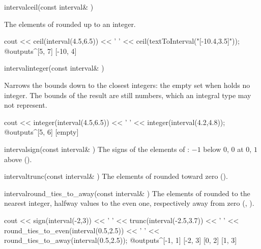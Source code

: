 \begin{deffun}{interval}{ceil}{(const interval\& )}
  \begin{operation}
  \end{operation}
  The elements of  rounded up to an integer.
  \begin{example}
cout << ceil(interval(4.5,6.5)) << ' '
     << ceil(textToInterval("[-10.4,3.5]"));
@outputs^[5, 7] [-10, 4]~
  \end{example}
\end{deffun}

\begin{deffun}{interval}{integer}{(const interval\& )}
  \begin{operation}
  \end{operation}
  Narrows the bounds down to the closest integers: the empty set when
   holds no integer. The bounds of the result are still
   numbers, which an integral type may not represent.
  \begin{example}
cout << integer(interval(4.5,6.5)) << ' '
     << integer(interval(4.2,4.8));
@outputs^[5, 6] [empty]~
  \end{example}
\end{deffun}

\begin{deffun}{interval}{sign}{(const interval\& )}
  The signs of the elements of : $-1$ below $0$, $0$ at $0$, $1$
  above ().\newinvfive
\end{deffun}

\begin{deffun}{interval}{trunc}{(const interval\& )}
  The elements of  rounded toward zero ().\newinvfive
\end{deffun}

\begin{deffun}{interval}{round\_ties\_to\_away}{(const interval\& )}
  The elements of  rounded to the nearest integer, halfway values to
  the even one, respectively away from zero (,
  ).\newinvfive
  \begin{example}
cout << sign(interval(-2,3)) << ' '
     << trunc(interval(-2.5,3.7)) << ' '
     << round_ties_to_even(interval(0.5,2.5)) << ' '
     << round_ties_to_away(interval(0.5,2.5));
@outputs^[-1, 1] [-2, 3] [0, 2] [1, 3]~
  \end{example}
\end{deffun}


